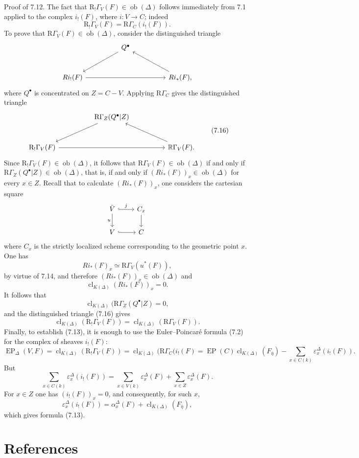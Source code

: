 \documentclass[11pt]{article}
\newcommand{\R}{\mathrm{R}}
\providecommand{\EP}{\operatorname{EP}}
\providecommand{\Ob}{\operatorname{ob}}
\providecommand{\Ob}{\operatorname{ob}}
\providecommand{\R}{\mathrm R}
\providecommand{\EP}{\operatorname{EP}}
\providecommand{\Ob}{\operatorname{Ob}}
\providecommand{\clK}[1]{\operatorname{cl}_{K(#1)}}
\providecommand{\RG}{\mathrm R\Gamma}
\providecommand{\Ob}{\operatorname{ob}}
\providecommand{\Ob}{\operatorname{Ob}}
\begin{document}
Proof of 7.12. The fact that $\R_!\Gamma_V(F)\in\Ob(\Delta)$ follows immediately from 7.1 applied to the complex $i_!(F)$, where $i:V\to C$; indeed
\[
\R_!\Gamma_V(F)=\RG_C(i_!(F)).
\]
To prove that $\RG_V(F)\in\Ob(\Delta)$, consider the distinguished triangle
\[
\begin{tikzcd}[column sep=huge,row sep=large]
& Q^\bullet \arrow[dl] &\\
Ri_!(F) \arrow[rr] && Ri_*(F) \arrow[ul],
\end{tikzcd}
\]
where $Q^\bullet$ is concentrated on $Z=C-V$. Applying $\RG_C$ gives the distinguished triangle
\[
\begin{tikzcd}[column sep=huge,row sep=large]
& \RG_Z(Q^\bullet|Z) \arrow[dl] &\\
\R_!\Gamma_V(F) \arrow[rr] && \mathbb{R}\Gamma_V(F) \arrow[ul].
\end{tikzcd}
\tag{7.16}
\]
Since $\R_!\Gamma_V(F)\in\Ob(\Delta)$, it follows that $\RG_V(F)\in\Ob(\Delta)$ if and only if $\RG_Z(Q^\bullet|Z)\in\Ob(\Delta)$, that is, if and only if $(Ri_*(F))_x\in\Ob(\Delta)$ for every $x\in Z$. Recall that to calculate $(Ri_*(F))_x$, one considers the cartesian square
\[
\begin{tikzcd}
\bar V \arrow[r,hook,"j"] \arrow[d,"u"'] & C_x \arrow[d]\\
V \arrow[r,hook] & C
\end{tikzcd}
\]
where $C_x$ is the strictly localized scheme corresponding to the geometric point $x$. One has
\[
Ri_*(F)_x\simeq \RG_{ V}(u^*(F)),
\]
by virtue of 7.14, and therefore $(Ri_*(F))_x\in\Ob(\Delta)$ and
\[
\clK{\Delta}(Ri_*(F))_x=0.
\]
It follows that
\[
\clK{\Delta}(\RG_Z(Q^\bullet|Z)=0,
\]
and the distinguished triangle (7.16) gives
\[
\clK{\Delta}(\R_!\Gamma_V(F))=\clK{\Delta}(\RG_V(F)).
\]
Finally, to establish (7.13), it is enough to use the Euler--Poincaré formula (7.2) for the complex of sheaves $i_!(F)$:
\[
\EP_\Delta(V,F)
=
\clK{\Delta}(\R_!\Gamma_V(F))
=
\clK{\Delta}(\RG_C(i_!(F)
=
\EP(C)\clK{\Delta}(F_{\bar\eta})
-\sum_{x\in C(k)}\varepsilon_x^\Delta(i_!(F)).
\]
But
\[
\sum_{x\in C(k)}\varepsilon_x^\Delta(i_!(F))
=
\sum_{x\in V(k)}\varepsilon_x^\Delta(F)
+\sum_{x\in Z}\varepsilon_x^\Delta(F).
\]
For $x\in Z$ one has $(i_!(F))_x=0$, and consequently, for such $x$,
\[
\varepsilon_x^\Delta(i_!(F))
=
\alpha_x^\Delta(F)+\clK{\Delta}(F_{\bar\eta}),
\]
which gives formula (7.13).

\section*{References}
\end{document}
